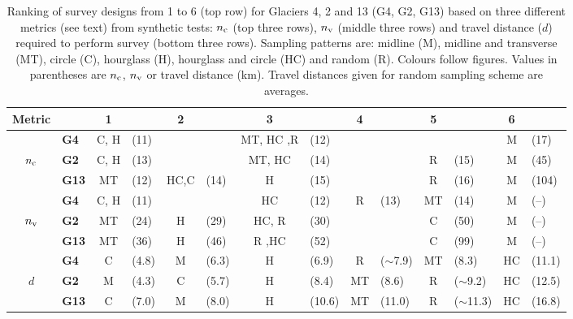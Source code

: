 \documentclass{article}
\begin{document}
\begin{table}[]
\centering
\caption{ Ranking of survey designs from 1 to 6 (top row) for Glaciers 4, 2 and 13 (G4, G2, G13) based on three different metrics (see text) from synthetic tests: $n_{\rm c}$ (top three rows), $n_{\rm v}$ (middle three rows) and travel distance ($d$) required to perform survey (bottom three rows). Sampling patterns are: midline (M), midline and transverse (MT), circle (C), hourglass (H), hourglass and circle (HC) and random (R). Colours follow figures. Values in parentheses are $n_{\rm c}$, $n_{\rm v}$ or travel distance (km). Travel distances given for random sampling scheme are averages.}
\label{tab:PatternRanks}
\begin{tabular}{clclclclclclcl}
\hline
 Metric 	&& \textbf{1} && \textbf{2} && \textbf{3} && \textbf{4} && \textbf{5} && \textbf{6} \\ 
 \hline
		& \textbf{G4}    & \textcolor{C}{C}, \textcolor{H}{H} 	& (11) 	&  	& 	&  \textcolor{MT}{MT}, \textcolor{HC}{HC} ,\textcolor{R}{R} 	& (12) 	&  	&   	&  	&  & \textcolor{M}{M} & (17) \\
$n_{\rm c}$ 	& \textbf{G2}   & \textcolor{C}{C}, \textcolor{H}{H} 	& (13) 	&  	&   	& \textcolor{MT}{MT}, \textcolor{HC}{HC} 	& (14) 	&  	&  	& \textcolor{R}{R} 	& (15) & \textcolor{M}{M} & (45) \\ 
		& \textbf{G13} & \textcolor{MT}{MT} 	& (12) 	& \textcolor{HC}{HC},\textcolor{C}{C} & (14) 	&  \textcolor{H}{H} 		& (15) 	&  		&   	& \textcolor{R}{R} 	& (16) & \textcolor{M}{M} & (104) \\ 
\hline
		& \textbf{G4}   & \textcolor{C}{C},  \textcolor{H}{H} 	& (11) 	& 	&   	& \textcolor{HC}{HC} 	& (12) 	& \textcolor{R}{R} 		& (13) 	& \textcolor{MT}{MT} & (14) & \textcolor{M}{M} & (--) \\
$n_{\rm v}$ 	& \textbf{G2}   & \textcolor{MT}{MT} 	& (24) 	& \textcolor{H}{H} 	& (29) 	& \textcolor{HC}{HC},  \textcolor{R}{R} 	& (30)	&  		& 	&  \textcolor{C}{C} 	& (50) & \textcolor{M}{M} & (--) \\ 
		& \textbf{G13} & \textcolor{MT}{MT} 	& (36) 	& \textcolor{H}{H} 	& (46) 	& \textcolor{R}{R} ,\textcolor{HC}{HC} 		& (52) 	& 	&  	& \textcolor{C}{C} 	& (99) & \textcolor{M}{M} & (--) \\ 
\hline
		& \textbf{G4}   & \textcolor{C}{C} 	& (4.8) & \textcolor{M}{M} 	& (6.3) & \textcolor{H}{H} 		& (6.9) 	& \textcolor{R}{R} 	& ($\sim$7.9) & \textcolor{MT}{MT} 	& (8.3) & \textcolor{HC}{HC} & (11.1) \\ 
$d$	& \textbf{G2}   & \textcolor{M}{M} 	& (4.3) & \textcolor{C}{C} 	& (5.7) & \textcolor{H}{H} 		& (8.4) 	& \textcolor{MT}{MT} & (8.6) 	& \textcolor{R}{R} 		& ($\sim$9.2) & \textcolor{HC}{HC} & (12.5) \\ 
		& \textbf{G13} & \textcolor{C}{C} 	& (7.0) & \textcolor{M}{M} 	& (8.0) & \textcolor{H}{H} 		& (10.6) 	& \textcolor{MT}{MT} & (11.0) 	& \textcolor{R}{R} 		& ($\sim$11.3) & \textcolor{HC}{HC} & (16.8)\\
\hline
\end{tabular}
\end{table}
\end{document}
